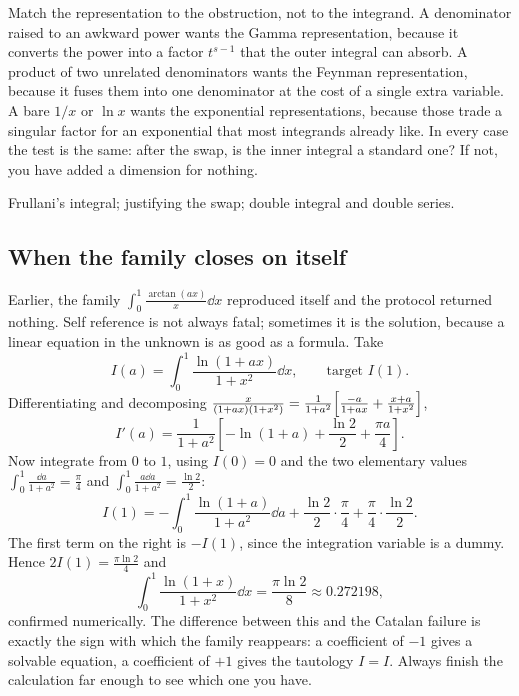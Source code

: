 \begin{keynote}
Match the representation to the obstruction, not to the integrand. A denominator raised to an awkward power wants the Gamma representation, because it converts the power into a factor $t^{s-1}$ that the outer integral can absorb. A product of two unrelated denominators wants the Feynman representation, because it fuses them into one denominator at the cost of a single extra variable. A bare $1/x$ or $\ln x$ wants the exponential representations, because those trade a singular factor for an exponential that most integrands already like. In every case the test is the same: after the swap, is the inner integral a standard one? If not, you have added a dimension for nothing.
\end{keynote}

\begin{seealsob}Frullani's integral; justifying the swap; double integral and double series.\end{seealsob}

\subsection{When the family closes on itself}

Earlier, the family $\int_0^1\frac{\arctan(ax)}{x}\dd x$ reproduced itself and the protocol returned nothing. Self reference is not always fatal; sometimes it is the solution, because a linear equation in the unknown is as good as a formula. Take
\[I(a)=\int_0^1\frac{\ln(1+ax)}{1+x^{2}}\dd x,\qquad\text{target }I(1).\]
Differentiating and decomposing $\frac{x}{(1+ax)(1+x^{2})}=\frac{1}{1+a^{2}}\Bigl[\frac{-a}{1+ax}+\frac{x+a}{1+x^{2}}\Bigr]$,
\[I'(a)=\frac{1}{1+a^{2}}\left[-\ln(1+a)+\frac{\ln2}{2}+\frac{\pi a}{4}\right].\]
Now integrate from $0$ to $1$, using $I(0)=0$ and the two elementary values $\int_0^1\frac{\dd a}{1+a^{2}}=\frac{\pi}{4}$ and $\int_0^1\frac{a\dd a}{1+a^{2}}=\frac{\ln2}{2}$:
\[I(1)=-\int_0^1\frac{\ln(1+a)}{1+a^{2}}\dd a+\frac{\ln2}{2}\cdot\frac{\pi}{4}+\frac{\pi}{4}\cdot\frac{\ln2}{2}.\]
The first term on the right is $-I(1)$, since the integration variable is a dummy. Hence $2I(1)=\frac{\pi\ln2}{4}$ and
\[\int_0^1\frac{\ln(1+x)}{1+x^{2}}\dd x=\frac{\pi\ln2}{8}\approx0.272198,\]
confirmed numerically. The difference between this and the Catalan failure is exactly the sign with which the family reappears: a coefficient of $-1$ gives a solvable equation, a coefficient of $+1$ gives the tautology $I=I$. Always finish the calculation far enough to see which one you have.

